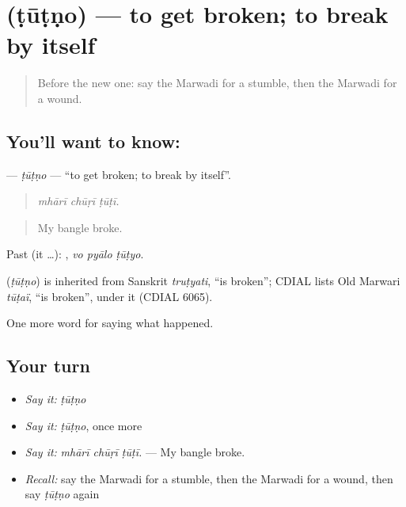 \section[\texorpdfstring{\mw{टूटणो} (ṭūṭṇo)}{टूटणो (ṭūṭṇo)}]{ (ṭūṭṇo) — to get broken; to break by itself}

\label{lesson:MW-C241-tutno}



\begin{quote}
Before the new one: say the Marwadi for a stumble, then the Marwadi for a wound.
\end{quote}

\subsection*{You'll want to know: }
\textbf{} — \emph{ṭūṭṇo} — \textquotedblleft{}to get broken; to break by itself\textquotedblright{}.

\begin{quote}
  
\end{quote}

\begin{quote}
\emph{mhārī chūṛī ṭūṭī.}
\end{quote}

\begin{quote}
My bangle broke.
\end{quote}

Past (it …):   , \emph{vo pyālo ṭūṭyo}.

\begin{cousinweb}
\textbf{} (\emph{ṭūṭṇo}) is inherited from Sanskrit \emph{truṭyati}, \textquotedblleft{}is broken\textquotedblright{}; CDIAL lists Old Marwari \emph{tūṭaï}, \textquotedblleft{}is broken\textquotedblright{}, under it (CDIAL 6065).
\end{cousinweb}

\begin{grammarlens}[title={What you've built}]
One more word for saying what happened.
\end{grammarlens}

\subsection*{Your turn}
\begin{itemize}
\raggedright
  \item \emph{Say it:} \emph{ṭūṭṇo}
  \item \emph{Say it:} \emph{ṭūṭṇo}, once more
  \item \emph{Say it:} \emph{mhārī chūṛī ṭūṭī.} — My bangle broke.
  \item \emph{Recall:} say the Marwadi for a stumble, then the Marwadi for a wound, then say \emph{ṭūṭṇo} again
\end{itemize}

